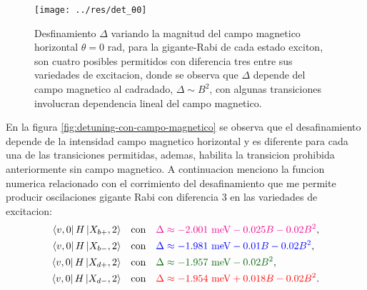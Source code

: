 \documentclass[../main.tex]{subfiles}
\begin{document}
\begin{figure}[bh]
	\centering
	\texttt{[image: ../res/det\_θ0]}
	\caption{Desfinamiento $\Delta$ variando la magnitud del campo magnetico horizontal $\theta=0$ rad, para la gigante-Rabi de cada estado exciton, son cuatro posibles permitidos con diferencia tres entre sus variedades de excitacion, donde se observa que $\Delta$ depende del campo magnetico al cadradado, $\Delta \sim B^2$, con algunas transiciones involucran dependencia lineal del campo magnetico.}
	\label{fig:det_θ0}
\end{figure}

En la figura \ref{fig:detuning-con-campo-magnetico} se observa que el desafinamiento depende de la intensidad campo magnetico horizontal y es diferente para cada una de las transiciones permitidas, ademas, habilita la transicion prohibida anteriormente sin campo magnetico. A continuacion menciono la funcion numerica relacionado con el corrimiento del desafinamiento que me permite producir oscilaciones gigante Rabi con diferencia 3 en las variedades de excitacion:
\begin{align}
	\bra{v,0}H\ket{X_{b+},2} &\quad \text{con} \quad \textcolor{magenta}{\Delta \approx -2.001\text{ meV} - 0.025B - 0.02B^2},\\
	\bra{v,0}H\ket{X_{b-},2} &\quad \text{con} \quad \textcolor{blue}{\Delta \approx -1.981\text{ meV} - 0.01B - 0.02B^2},\\
	\bra{v,0}H\ket{X_{d+},2} &\quad \text{con} \quad \textcolor{darkgreen}{\Delta \approx -1.957\text{ meV} - 0.02B^2},\\
	\bra{v,0}H\ket{X_{d-},2} &\quad \text{con} \quad \textcolor{red}{\Delta \approx -1.954\text{ meV} + 0.018B - 0.02B^2}.
\end{align}


%
\end{document}
